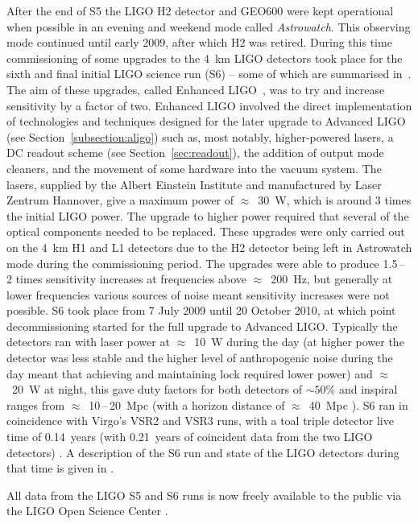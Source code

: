After the end of S5 the LIGO H2 detector and GEO600 were kept operational when possible in an evening and 
weekend mode called \textit{Astrowatch}. This observing mode continued until early 2009, after which H2 was 
retired. During this time commissioning of some upgrades to the 4~km LIGO detectors took place for the sixth 
and final initial LIGO science run (S6) -- some of which are summarised in~\cite{Whitcomb:2008}. The aim of 
these upgrades, called Enhanced LIGO~\cite{EnhancedLIGO}, was to try and increase sensitivity by a factor of 
two. Enhanced LIGO involved the direct implementation of technologies and techniques designed for the later
upgrade to Advanced LIGO (see Section~\ref{subsection:aligo}) such as, most notably, higher-powered lasers, a 
DC readout scheme (see Section~\ref{sec:readout}), the addition of output mode cleaners, and the movement of 
some hardware into the vacuum system. The lasers, supplied by the Albert Einstein Institute and manufactured 
by Laser Zentrum Hannover, give a maximum power of $\approx$~30~W, which is around 3 times the initial LIGO 
power. The upgrade to higher power required that several of the optical components needed to be replaced. 
These upgrades were only carried out on the 4~km H1 and L1 detectors due to the H2 detector being left in 
Astrowatch mode during the commissioning period. The upgrades were able to produce 1.5\,--\,2 times 
sensitivity increases at frequencies above $\approx$~200~Hz, but generally at lower frequencies various 
sources of noise meant sensitivity increases were not possible. S6 took place from 7 July 2009
until 20 October 2010, at which point decommissioning started for the full upgrade to Advanced LIGO. 
Typically the detectors ran with laser power at $\approx$~10~W during the day (at higher power the detector
was less stable and the higher level of anthropogenic noise during the day meant that achieving and 
maintaining lock required lower power) and $\approx$~20~W at night, this gave duty factors for both 
detectors of $\sim 50$\% and inspiral ranges from $\approx$~10\,--\,20~Mpc (with a horizon distance of 
$\approx$~40~Mpc \cite{2012PhRvD..85h2002A}). S6 ran in coincidence with Virgo's VSR2 and VSR3 runs, with a 
toal triple detector live time of 0.14~years (with 0.21~years of coincident data from the two LIGO detectors) 
\cite{2012PhRvD..85h2002A}. A description of the S6 run and state of the LIGO detectors during that time is 
given in \cite{2015CQGra..32k5012A}.

All data from the LIGO S5 \cite{LOSCS5} and S6 \cite{LOSCS6} runs is now freely available to the public via 
the LIGO Open Science Center \cite{LOSC, 2015JPhCS.610a2021V}.

